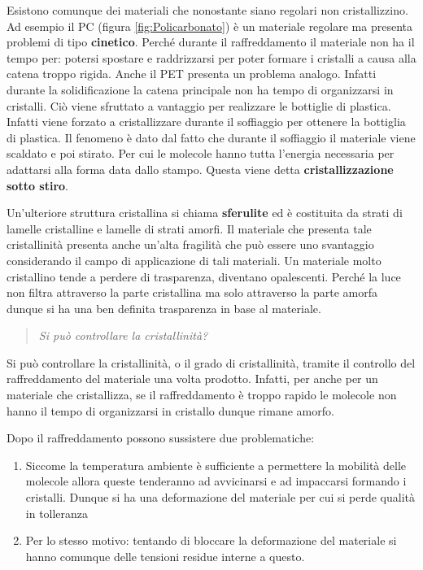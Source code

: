 Esistono comunque dei materiali che nonostante siano regolari non cristallizzino. Ad esempio il \ac{PC} (figura \ref{fig:Policarbonato}) è un materiale regolare ma presenta problemi di tipo \textbf{cinetico}. Perché durante il raffreddamento il materiale non ha il tempo per: potersi spostare e raddrizzarsi per poter formare i cristalli a causa alla catena troppo rigida. 
Anche il \ac{PET} presenta un problema analogo. Infatti durante la solidificazione la catena principale non ha tempo di organizzarsi in cristalli. Ciò viene sfruttato a vantaggio per realizzare le bottiglie di plastica. Infatti viene forzato a cristallizzare durante il soffiaggio per ottenere la bottiglia di plastica.
Il fenomeno è dato dal fatto che durante il soffiaggio il materiale viene scaldato e poi stirato. Per cui le molecole hanno tutta l'energia necessaria per adattarsi alla forma data dallo stampo.
Questa viene detta \textbf{cristallizzazione sotto stiro}. 

Un'ulteriore struttura cristallina si chiama \textbf{sferulite} ed è costituita da strati di lamelle cristalline e lamelle di strati amorfi.
Il materiale che presenta tale cristallinità presenta anche un'alta fragilità che può essere uno svantaggio considerando il campo di applicazione di tali materiali.
Un materiale molto cristallino tende a perdere di trasparenza, diventano opalescenti. Perché la luce non filtra attraverso la parte cristallina ma solo attraverso la parte amorfa dunque si ha una ben definita trasparenza in base al materiale.

\begin{quote}
\emph{Si può controllare la cristallinità?}
\end{quote}
Si può controllare la cristallinità, o il grado di cristallinità, tramite il controllo del raffreddamento del materiale una volta prodotto.
Infatti, per anche per un materiale che cristallizza, se il raffreddamento è troppo rapido le molecole non hanno il tempo di organizzarsi in cristallo dunque rimane amorfo.

Dopo il raffreddamento possono sussistere due problematiche:
\begin{enumerate}
\item Siccome la temperatura ambiente è sufficiente a permettere la mobilità delle molecole allora queste tenderanno ad avvicinarsi e ad impaccarsi formando i cristalli. Dunque si ha una deformazione del materiale per cui si perde qualità in tolleranza 
\item Per lo stesso motivo: tentando di bloccare la deformazione del materiale si hanno comunque delle tensioni residue interne a questo.
\end{enumerate}

